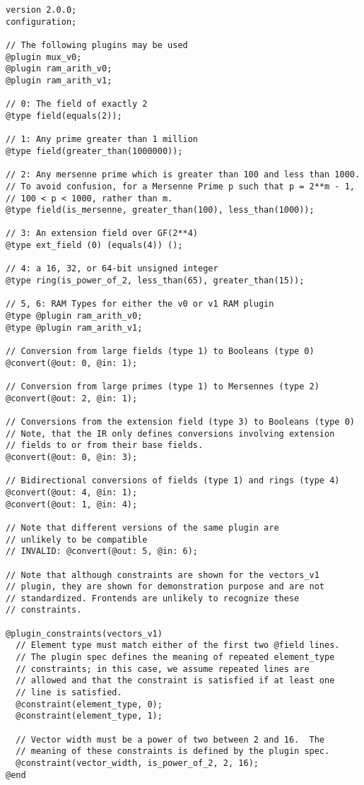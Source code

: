 \begin{lstlisting}[language=ir]
version 2.0.0;
configuration;

// The following plugins may be used
@plugin mux_v0;
@plugin ram_arith_v0;
@plugin ram_arith_v1;

// 0: The field of exactly 2
@type field(equals(2));

// 1: Any prime greater than 1 million
@type field(greater_than(1000000));

// 2: Any mersenne prime which is greater than 100 and less than 1000.
// To avoid confusion, for a Mersenne Prime p such that p = 2**m - 1,
// 100 < p < 1000, rather than m.
@type field(is_mersenne, greater_than(100), less_than(1000));

// 3: An extension field over GF(2**4)
@type ext_field (0) (equals(4)) ();

// 4: a 16, 32, or 64-bit unsigned integer
@type ring(is_power_of_2, less_than(65), greater_than(15));

// 5, 6: RAM Types for either the v0 or v1 RAM plugin
@type @plugin ram_arith_v0;
@type @plugin ram_arith_v1;

// Conversion from large fields (type 1) to Booleans (type 0)
@convert(@out: 0, @in: 1);

// Conversion from large primes (type 1) to Mersennes (type 2)
@convert(@out: 2, @in: 1);

// Conversions from the extension field (type 3) to Booleans (type 0)
// Note, that the IR only defines conversions involving extension
// fields to or from their base fields.
@convert(@out: 0, @in: 3);

// Bidirectional conversions of fields (type 1) and rings (type 4)
@convert(@out: 4, @in: 1);
@convert(@out: 1, @in: 4);

// Note that different versions of the same plugin are
// unlikely to be compatible
// INVALID: @convert(@out: 5, @in: 6);

// Note that although constraints are shown for the vectors_v1
// plugin, they are shown for demonstration purpose and are not
// standardized. Frontends are unlikely to recognize these
// constraints.

@plugin_constraints(vectors_v1)
  // Element type must match either of the first two @field lines.
  // The plugin spec defines the meaning of repeated element_type
  // constraints; in this case, we assume repeated lines are
  // allowed and that the constraint is satisfied if at least one
  // line is satisfied.
  @constraint(element_type, 0);
  @constraint(element_type, 1);

  // Vector width must be a power of two between 2 and 16.  The
  // meaning of these constraints is defined by the plugin spec.
  @constraint(vector_width, is_power_of_2, 2, 16);
@end
\end{lstlisting}

